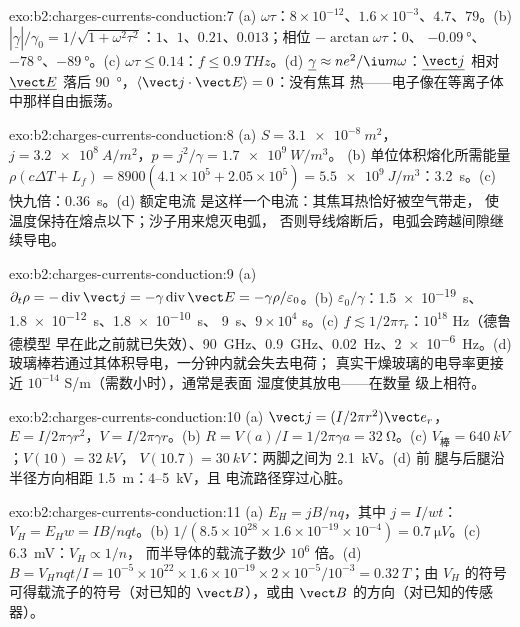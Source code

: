 \begin{solution}{exo:b2:charges-currents-conduction:7}
(a) $\omega\tau$：$8 \times 10^{-12}$、$1.6 \times 10^{-3}$、$4.7$、$79$。(b) $|\underline\gamma|/\gamma_0 =
1/\sqrt{1 + \omega^2\tau^2}$：$1$、$1$、$0.21$、$0.013$；相位 $-\arctan\omega\tau$：$0$、
$-\qty{0.09}{\degree}$、$-\qty{78}{\degree}$、$-\qty{89}{\degree}$。(c) $\omega\tau \le 0.14$：$f \le
\qty{0.9}{THz}$。(d) $\underline\gamma \approx ne^2/\iu m\omega$：$\underline{\vect j}$ 相对
$\underline{\vect E}$ 落后 \qty{90}{\degree}，$\langle\vect j\cdot\vect E\rangle = 0$：没有焦耳
热——电子像在等离子体中那样自由振荡。
\end{solution}

\begin{solution}{exo:b2:charges-currents-conduction:8}
(a) $S = \qty{3.1e-8}{m^2}$，$j = \qty{3.2e8}{A/m^2}$，$p = j^2/\gamma = \qty{1.7e9}{W/m^3}$。
(b) 单位体积熔化所需能量 $\rho(c\Delta T + L_f) = 8900(4.1 \times 10^5 + 2.05 \times
10^5) = \qty{5.5e9}{J/m^3}$：\qty{3.2}{s}。(c) 快九倍：\qty{0.36}{s}。(d) 额定电流
是这样一个电流：其焦耳热恰好被空气带走，
使温度保持在熔点以下；沙子用来熄灭电弧，
否则导线熔断后，电弧会跨越间隙继续导电。
\end{solution}

\begin{solution}{exo:b2:charges-currents-conduction:9}
(a) $\partial_t\rho = -\operatorname{div}\vect j = -\gamma\operatorname{div}\vect E = -\gamma\rho/
\varepsilon_0$。(b) $\varepsilon_0/\gamma$：\qty{1.5e-19}{s}、\qty{1.8e-12}{s}、\qty{1.8e-10}{s}、
\qty{9}{s}、$9 \times 10^4$ s。(c) $f \lesssim 1/2\pi\tau_r$：$10^{18}$ Hz（德鲁德模型
早在此之前就已失效）、\qty{90}{GHz}、\qty{0.9}{GHz}、\qty{0.02}{Hz}、\qty{2e-6}{Hz}。(d)
玻璃棒若通过其体积导电，一分钟内就会失去电荷；
真实干燥玻璃的电导率更接近 $10^{-14}$ S/m（需数小时），通常是表面
湿度使其放电——在数量
级上相符。
\end{solution}

\begin{solution}{exo:b2:charges-currents-conduction:10}
(a) $\vect j = (I/2\pi r^2)\vect e_r$，$E = I/2\pi\gamma r^2$，$V = I/2\pi\gamma r$。(b) $R = V(a)
/I = 1/2\pi\gamma a = \qty{32}{\ohm}$。(c) $V_{\text{棒}} = \qty{640}{kV}$；$V(10) = \qty{32}{kV}$，
$V(10.7) = \qty{30}{kV}$：两脚之间为 \qty{2.1}{kV}。(d) 前
腿与后腿沿半径方向相距 \qty{1.5}{m}：$4$--\qty{5}{kV}，且
电流路径穿过心脏。
\end{solution}

\begin{solution}{exo:b2:charges-currents-conduction:11}
(a) $E_H = jB/nq$，其中 $j = I/wt$：$V_H = E_Hw = IB/nqt$。(b) $1/(8.5 \times 10^{28}
\times 1.6 \times 10^{-19} \times 10^{-4}) = \qty{0.7}{\micro V}$。(c) \qty{6.3}{mV}：$V_H \propto 1/n$，
而半导体的载流子数少 $10^6$ 倍。(d) $B = V_Hnqt/I =
10^{-5} \times 10^{22} \times 1.6 \times 10^{-19} \times 2 \times 10^{-5}/10^{-3} = \qty{0.32}{T}$；由
$V_H$ 的符号可得载流子的符号（对已知的 $\vect B$），或由
$\vect B$ 的方向（对已知的传感器）。
\end{solution}

